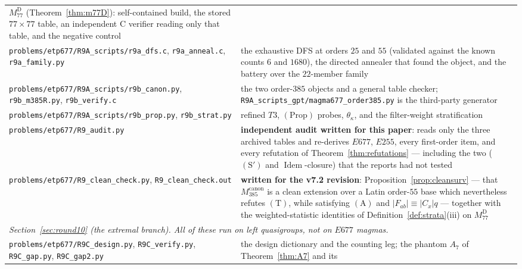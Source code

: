 \documentclass[11pt]{article}
\theoremstyle{plain}
\theoremstyle{definition}
\theoremstyle{remark}
\numberwithin{equation}{section}
\newcommand{\Idem}{\operatorname{Idem}}
\begin{document}
\begin{longtable}{p{}p{}}
$M_{77}^{\mathrm{D}}$ (Theorem~\ref{thm:m77D}): self-contained build, the stored
$77\times77$ table, an independent \textsc{C} verifier reading only that table, and
the negative control\\
\texttt{problems\slash etp677\slash R9A\_scripts\slash r9a\_dfs.c},\newline
\texttt{r9a\_anneal.c}, \texttt{r9a\_family.py} & the exhaustive DFS at orders
$25$ and $55$ (validated against the known counts $6$ and $1680$), the directed
annealer that found the object, and the battery over the $22$-member family\\
\texttt{problems\slash etp677\slash R9A\_scripts\slash r9b\_canon.py},\newline
\texttt{r9b\_m385R.py}, \texttt{r9b\_verify.c} & the two order-$385$ objects and a
general table checker; \texttt{R9A\_scripts\_gpt\slash magma677\_order385.py} is the
third-party generator\\
\texttt{problems\slash etp677\slash R9A\_scripts\slash r9b\_prop.py},\newline
\texttt{r9b\_strat.py} & refined $T3$, $(\mathrm{Prop})$ probes, $\theta_\kappa$,
and the filter-weight stratification\\
\texttt{problems\slash etp677\slash R9\_audit.py} &
\textbf{independent audit written for this paper}: reads only the three archived
tables and re-derives $E677$, $E255$, every first-order item, and every refutation
of Theorem~\ref{thm:refutations} --- including the two ($(\mathrm{S}')$ and
$\Idem$-closure) that the reports had not tested\\
\texttt{problems\slash etp677\slash R9\_clean\_check.py},\newline
\texttt{R9\_clean\_check.out} & \textbf{written for the v7.2 revision}:
Proposition~\ref{prop:cleansurv} --- that $M_{385}^{\mathrm{canon}}$ is a clean
extension over a Latin order-$55$ base which nevertheless refutes $(\mathrm{T})$,
while satisfying $(\mathrm{A})$ and $|F_{ab}|\equiv|C_x|q$ --- together with the
weighted-statistic identities of Definition~\ref{def:strata}(iii) on
$M_{77}^{\mathrm{D}}$\\
\midrule
\multicolumn{2}{p{0.94\textwidth}}{\emph{Section~\ref{sec:round10} (the extremal
branch). All of these run on left quasigroups, not on $E677$ magmas.}}\\
\midrule
\texttt{problems\slash etp677\slash R9C\_design.py},\newline
\texttt{R9C\_verify.py}, \texttt{R9C\_gap.py}, \texttt{R9C\_gap2.py} & the design
dictionary and the counting leg; the phantom $A_7$ of Theorem~\ref{thm:A7} and its

\end{longtable}
\end{document}
